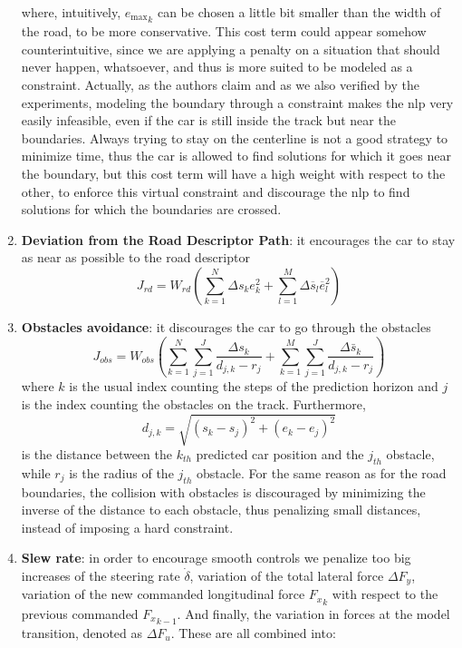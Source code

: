 \documentclass[a4paper, onecolumn, 11pt]{article}
\begin{document}
\begin{enumerate}
    where, intuitively, ${e_{\text{max}}}_k$ can be chosen a little bit smaller
    than the width of the road, to be more conservative. This cost term could
    appear somehow counterintuitive, since we are applying a penalty on a
    situation that should never happen, whatsoever, and thus is more suited to
    be modeled as a constraint. Actually, as the authors claim and as we also
    verified by the experiments, modeling the boundary through a constraint
    makes the nlp very easily infeasible, even if the car is still inside the
    track but near the boundaries. Always trying to stay on the centerline is
    not a good strategy to minimize time, thus the car is allowed to find
    solutions for which it goes near the boundary, but this cost term will have
    a high weight with respect to the other, to enforce this virtual constraint
    and discourage the nlp to find solutions for which the boundaries are
    crossed.

    \item \textbf{Deviation from the Road Descriptor Path}: it encourages the car to stay as near as possible to the road descriptor
    \begin{equation}
    J_{rd} = W_{rd} \left( \sum_{k=1}^{N} \Delta s_k e_k^2 + \sum_{l=1}^{M} \Delta\overline{s}_l \overline{e}_l^2 \right)
    \end{equation}

    \item \textbf{Obstacles avoidance}: it discourages the car to go through the obstacles
    \begin{equation}
        J_{obs} = W_{obs} \left( \sum_{k=1}^{N} \sum_{j=1}^{J} \frac{\Delta s_k}{d_{j,k} - r_j} + \sum_{k=1}^{M} \sum_{j=1}^{J} \frac{\Delta \bar{s}_k}{d_{j,k} - r_j} \right)
    \end{equation}
    where $k$ is the usual index counting the steps of the prediction horizon
    and $j$ is the index counting the obstacles on the track. Furthermore,
    \[d_{j,k} = \sqrt{(s_k-s_j)^2 + (e_k-e_j)^2}\] is the distance between the
    $k_{th}$ predicted car position and the $j_{th}$ obstacle, while $r_j$ is
    the radius of the $j_{th}$ obstacle. For the same reason as for the road
    boundaries, the collision with obstacles is discouraged by minimizing the
    inverse of the distance to each obstacle, thus penalizing small distances,
    instead of imposing a hard constraint.

    \item \textbf{Slew rate}: in order to encourage smooth controls we penalize too big increases of the steering rate $\dot{\delta}$, variation of the total lateral force $\Delta F_y$, variation of the new commanded longitudinal force ${F_x}_k$ with respect to the previous commanded ${F_x}_{k-1}$.
    And finally, the variation in forces at the model transition, denoted as $\Delta F_u$.
    These are all combined into:
    

\end{enumerate}
\end{document}
